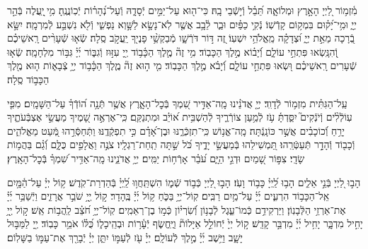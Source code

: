\documentclass[twoside, openany, parskip=half, 11pt]{book}
\begin{document}
\tachanunim

\vfill




\begin{small}
מִ֫זְמ֥וֹר
לַ֭יְיָ הָאָ֣רֶץ וּמְלוֹאָ֑הּ תֵּ֝בֵ֗ל וְֿי֣שְֿׁבֵי בָֽהּ׃
כִּי־ה֖וּא עַל־יַמִּ֣ים יְֿסָדָ֑הּ וְֿעַל־נְ֝הָר֗וֹת יְֿכֽוֹנֲנֶֽהָ׃
מִ֥י ֖יַֽעֲלֶה בְּֿהַ֣ר יְיָ֑ וּמִ֥י־יָ֝ק֗וּם בִּמְק֥וֹם קָדְֿשֽׁוֹ׃
נְֿקִ֥י כַפַּ֗יִם וּבַ֢ר לֵ֫בָ֥ב אֲשֶׁ֤ר לֹֽא־נָשָׂ֣א לַשָּׁ֣וְא נַפְשִׁ֑י וְֿלֹ֖א נִשְׁבַּ֣ע לְֿמִרְמָֽה׃
יִשָּׂ֣א בְֿ֭רָכָה מֵאֵ֣ת יְיָ֑ וּ֝צְדָקָ֗ה מֵֽאֱלֹהֵ֥י יִשְׁעֽוֹ׃
זֶ֭ה דּ֣וֹר דֹּרְֿשָׁ֑ו מְֿבַקְשֵׁ֥֨י פָנֶי֖ךָ יַֽעֲקֹ֣ב סֶֽלָה׃
שְֿׂא֤וּ שְֿׁעָרִ֨ים רָֽאשֵׁיכֶ֗ם וְֿ֭הִנָּֽשְׂאוּ פִּתְחֵ֣י עוֹלָ֑ם וְֿ֝יָב֗וֹא מֶ֣לֶךְ הַכָּבֽוֹד׃
מִ֥י זֶה֘ מֶ֤לֶךְ הַכָּ֫ב֥וֹד יְ֖יָ עִזּ֣וּז וְֿגִבּ֑וֹר יְ֜יָ֗ גִּבּ֥וֹר מִלְחָמָֽה׃
שְֿׂא֤וּ שְֿׁעָרִים רָֽאשֵׁיכֶ֗ם וּ֭שְׂאוּ פִּתְחֵ֣י עוֹלָ֑ם וְֿ֝יָבֹ֗א מֶ֣לֶךְ הַכָּבֽוֹד׃
מִ֤י ה֣וּא זֶה֘ מֶ֢לֶךְ הַכָּ֫ב֥וֹד יְיָ֥ צְֿבָא֑וֹת ה֤וּא מֶ֖לֶךְ הַכָּב֣וֹד סֶֽלָה׃


עַֽל־הַגִּתִּ֗ית מִזְמ֥וֹר לְֿדָוִֽד׃
יְיָ֤ אֲדֹנֵ֗ינוּ מָֽה־אַדִּ֣יר שִׁ֭מְךָ בְּֿכׇל־הָאָ֑רֶץ אֲשֶׁ֥ר תְּֿנָ֥ה ה֝וֹדְֿךָ֗ עַל־הַשָּׁמָֽיִם׃
מִפִּ֤י עֽוֹלְֿלִ֨ים וְֽֿיֹנְֿקִים֮ יִסַּ֪דְתָּ֫ עֹ֥ז לְֿמַ֥עַן צוֹרְֿרֶ֑יךָ לְֿהַשְׁבִּ֥ית א֝וֹיֵ֗ב וּמִתְנַקֵּֽם׃
כִּֽי־אֶרְאֶ֣ה שָׁ֭מֶיךָ מַעֲשֵׂ֣י אֶצְבְּֿעֹתֶ֑יךָ יָרֵ֥חַ וְֿ֝כוֹכָבִ֗ים אֲשֶׁ֣ר כּוֹנָֽנְֿתָּה׃
מָֽה־אֱנ֥וֹשׁ כִּֽי־תִזְכְּֿרֶ֑נּוּ וּבֶן־אָ֝דָ֗ם כִּ֣י תִפְקְֿדֶֽנּוּ׃
וַתְּֿחַסְּֿרֵ֣הוּ מְּֿ֭עַט מֵאֱלֹהִ֑ים וְֿכָב֖וֹד וְֿהָדָ֣ר תְּֿעַטְּֿרֵֽהוּ׃
תַּ֭מְשִׁילֵהוּ בְּֿמַעֲשֵׂ֣י יָדֶ֑יךָ כֹּ֝ל שַׁ֣תָּה תַֽחַת־רַגְלָֽיו׃
צֹנֶ֣ה וַאֲלָפִ֣ים כֻּלָּ֑ם וְֿ֝גַ֗ם בַּהֲמ֥וֹת שָׂדָֽי׃
צִפּ֣וֹר שָׁ֭מַיִם וּדְגֵ֣י הַיָּ֑ם עֹ֝בֵ֗ר אָרְֿח֥וֹת יַמִּֽים׃
יְיָ֥ אֲדֹנֵ֑ינוּ מָֽה־אַדִּ֥יר שִׁ֝מְךָ֗ בְּֿכׇל־הָאָֽרֶץ׃



הָב֣וּ לַ֭יְיָ בְּֿנֵ֣י אֵלִ֑ים הָב֥וּ לַֽ֝יְיָ֗ כָּב֥וֹד וָעֹֽז׃
הָב֣וּ לַ֭יְיָ כְּֿב֣וֹד שְֿׁמ֑וֹ הִשְׁתַּֽחֲו֥וּ לַֽ֝יְיָ֗ בְּֿהַדְרַת־קֹֽדֶשׁ׃
ק֥וֹל יְיָ֗ עַל־הַ֫מָּ֥יִם אֵֽל־הַכָּב֥וֹד הִרְעִ֑ים יְ֜יָ֗ עַל־מַ֥יִם רַבִּֽים׃
קֽוֹל־יְיָ֥ בַּכֹּ֑חַ ק֥וֹל יְ֜יָ֗ בֶּֽהָדָר׃
ק֣וֹל יְ֖יָ֥ שֹׁבֵ֣ר אֲרָזִ֑ים וַיְֿשַׁבֵּ֥ר יְ֜יָ֗ אֶת־אַרְזֵ֥י הַלְּֿבָנֽוֹן׃
וַיַּרְקִידֵ֥ם כְּֿמוֹ־עֵ֑גֶל לְֿבָנ֥וֹן וְֿ֝שִׂרְי֗וֹן כְּֿמ֣וֹ בֶן־רְאֵמִֽים׃
קֽוֹל־יְיָ֥ חֹ֝צֵ֗ב לַֽהֲב֥וֹת אֵֽשׁ׃
ק֣וֹל יְ֖יָ֥ יָחִ֣יל מִדְבָּ֑ר יָחִ֥יל יְ֜יָ֗ מִדְבַּ֣ר קָדֵֽשׁ׃
ק֣וֹל יְיָ֙ יְֿחוֹלֵ֣ל אַיָּלוֹת֘ וַיֶּֽחֱשׂ֢ף יְֿעָ֫ר֥וֹת וּבְהֵֽיכָל֑וֹ כֻּ֝לּ֗וֹ אֹמֵ֥ר כָּבֽוֹד׃
יְ֖יָ לַמַּבּ֣וּל יָשָׁ֑ב וַיֵּ֥שֶׁב יְ֜יָ֗ מֶ֣לֶךְ לְֿעוֹלָֽם׃
יְיָ֗ עֹ֖ז לְֿעַמּ֣וֹ יִתֵּ֑ן יְיָ֓ יְֿבָרֵ֖ךְ אֶת־עַמּ֣וֹ בַשָּׁלֽוֹם׃

\end{small}
\end{document}
